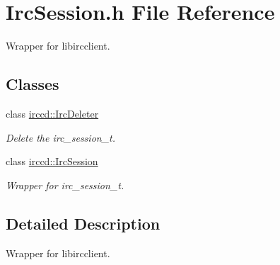 \hypertarget{a00083}{\section{Irc\-Session.\-h File Reference}
\label{a00083}
}


Wrapper for libircclient.  


\subsection*{Classes}
\begin{DoxyCompactItemize}
\item 
class \hyperlink{a00034}{irccd\-::\-Irc\-Deleter}
\begin{DoxyCompactList}\small\item\em Delete the irc\-\_\-session\-\_\-t. \end{DoxyCompactList}\item 
class \hyperlink{a00035}{irccd\-::\-Irc\-Session}
\begin{DoxyCompactList}\small\item\em Wrapper for irc\-\_\-session\-\_\-t. \end{DoxyCompactList}\end{DoxyCompactItemize}


\subsection{Detailed Description}
Wrapper for libircclient. 